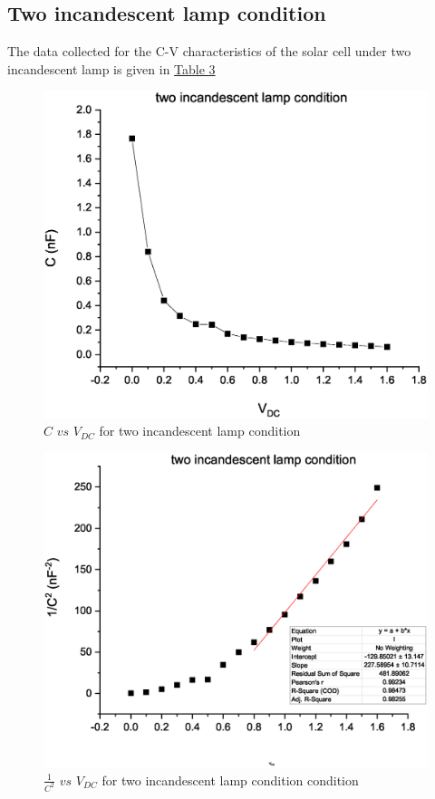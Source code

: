           \subsection{Two incandescent lamp condition}
 The data collected for the C-V characteristics of the solar cell under two incandescent lamp is given in \hyperref[tab:4]{Table 3}
		
    \begin{figure}[H]
			\centering
			\includegraphics[width=0.75\columnwidth]{images/GR4.eps}
			\caption{ $C$ $vs$ $V_{DC}$ for two incandescent lamp condition}
			\label{graph:7}
\end{figure}
\begin{figure}[H]
			\centering
			\includegraphics[width=0.75\columnwidth]{images/GR8.eps}
			\caption{$\frac{1}{C^2}$ $vs$ $V_{DC}$ for two incandescent lamp condition condition}
			\label{graph:8}
\end{figure}
  
		
  
